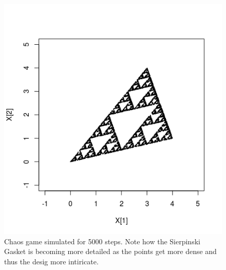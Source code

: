 \documentclass[11pt]{article}
\begin{document}
\begin{figure}[H]
\begin{center}
\includegraphics[scale=0.5]{../Results/Plots/Chaos_5000.png}
\caption{Chaos game simulated for 5000 steps. Note how the Sierpinski Gasket is becoming more detailed as the points get more dense and thus the desig more intiricate.}
\end{center}
\end{figure}
\end{document}
